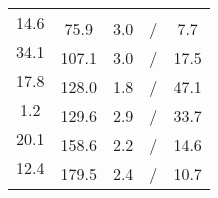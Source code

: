 \begin{tabular}{|ccccc|}
\multirow{2}{*}{14.6} & & & & \\ \cline{2-5} 
 & \multirow{2}{*}{75.9} & \multirow{2}{*}{3.0} & \multirow{2}{*}{/} & \multirow{2}{*}{7.7} \\ %
\multirow{2}{*}{34.1} & & & & \\ \cline{2-5} 
 & \multirow{2}{*}{107.1} & \multirow{2}{*}{3.0} & \multirow{2}{*}{/} & \multirow{2}{*}{17.5} \\ %
\multirow{2}{*}{17.8} & & & & \\ \cline{2-5} 
 & \multirow{2}{*}{128.0} & \multirow{2}{*}{1.8} & \multirow{2}{*}{/} & \multirow{2}{*}{47.1} \\ %
\multirow{2}{*}{1.2} & & & & \\ \cline{2-5} 
 & \multirow{2}{*}{129.6} & \multirow{2}{*}{2.9} & \multirow{2}{*}{/} & \multirow{2}{*}{33.7} \\ %
\multirow{2}{*}{20.1} & & & & \\ \cline{2-5} 
 & \multirow{2}{*}{158.6} & \multirow{2}{*}{2.2} & \multirow{2}{*}{/} & \multirow{2}{*}{14.6} \\ %
\multirow{2}{*}{12.4} & & & & \\ \cline{2-5} 
 & \multirow{2}{*}{179.5} & \multirow{2}{*}{2.4} & \multirow{2}{*}{/} & \multirow{2}{*}{10.7} \\ %
 & & & & \\ \hline
\end{tabular}